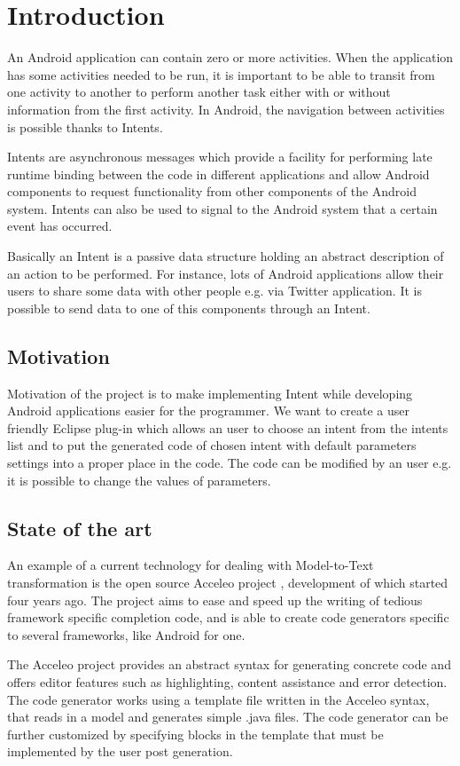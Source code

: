 \section{Introduction}

An Android application can contain zero or more activities. When the application has some activities needed to be run, it is important to be able to transit from one activity to another to perform another task either with or without information from the first activity. In Android, the navigation between activities is possible thanks to Intents.

Intents are asynchronous messages which provide a facility for performing late runtime binding between the code in different applications and allow Android components to request functionality from other components of the Android system. Intents can also be used to signal to the Android system that a certain event has occurred.

Basically an Intent is a passive data structure holding an abstract description of an action to be performed. For instance, lots of Android applications allow their users to share some data with other people e.g. via Twitter application. It is possible to send data to one of this components through an Intent.

\subsection{Motivation}
Motivation of the project is to make implementing Intent while developing Android applications easier for the programmer. We want to create a user friendly Eclipse plug-in which allows an user to choose an intent from the intents list and to put the generated code of chosen intent with default parameters settings into a proper place in the code. The code can be modified by an user e.g. it is possible to change the values of parameters.

\subsection{State of the art}
An example of a current technology for dealing with Model-to-Text transformation is the open source Acceleo project \cite{acceleo}, development of which started four years ago. The project aims to ease and speed up the writing of tedious framework specific completion code, and is able to create code generators specific to several frameworks, like Android for one.

The Acceleo project provides an abstract syntax for generating concrete code and offers editor features such as highlighting, content assistance and error detection. The code generator works using a template file written in the Acceleo syntax, that reads in a model and generates simple .java files. The code generator can be further customized by specifying blocks in the template that must be implemented by the user post generation.


